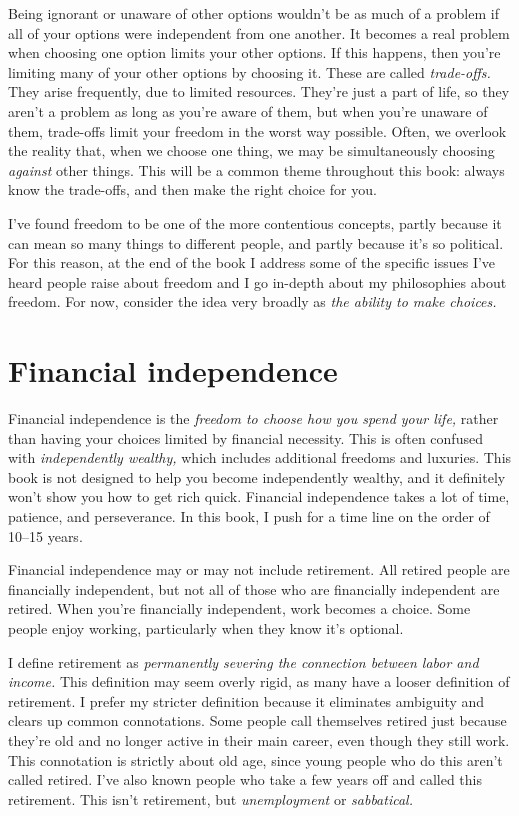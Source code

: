 Being ignorant or unaware of other options wouldn't be as much of a problem if all of your options were independent from one another. It becomes a real problem when choosing one option limits your other options. If this happens, then you're limiting many of your other options by choosing it. These are called \emph{trade-offs.} They arise frequently, due to limited resources. They're just a part of life, so they aren't a problem as long as you're aware of them, but when you're unaware of them, trade-offs limit your freedom in the worst way possible. Often, we overlook the reality that, when we choose one thing, we may be simultaneously choosing \emph{against} other things. This will be a common theme throughout this book: always know the trade-offs, and then make the right choice for you.

I've found freedom to be one of the more contentious concepts, partly because it can mean so many things to different people, and partly because it's so political. For this reason, at the end of the book I address some of the specific issues I've heard people raise about freedom and I go in-depth about my philosophies about freedom. For now, consider the idea very broadly as \emph{the ability to make choices.}

\section{Financial independence}
Financial independence is the \emph{freedom to choose how you spend your life,} rather than having your choices limited by financial necessity. This is often confused with \emph{independently wealthy,} which includes additional freedoms and luxuries. This book is not designed to help you become independently wealthy, and it definitely won't show you how to get rich quick. Financial independence takes a lot of time, patience, and perseverance. In this book, I push for a time line on the order of 10--15 years.

Financial independence may or may not include retirement. All retired people are financially independent, but not all of those who are financially independent are retired. When you're financially independent, work becomes a choice. Some people enjoy working, particularly when they know it's optional.

I define retirement as \emph{permanently severing the connection between labor and income.} This definition may seem overly rigid, as many have a looser definition of retirement. I prefer my stricter definition because it eliminates ambiguity and clears up common connotations. Some people call themselves retired just because they're old and no longer active in their main career, even though they still work. This connotation is strictly about old age, since young people who do this aren't called retired. I've also known people who take a few years off and called this retirement. This isn't retirement, but \emph{unemployment} or \emph{sabbatical.}

